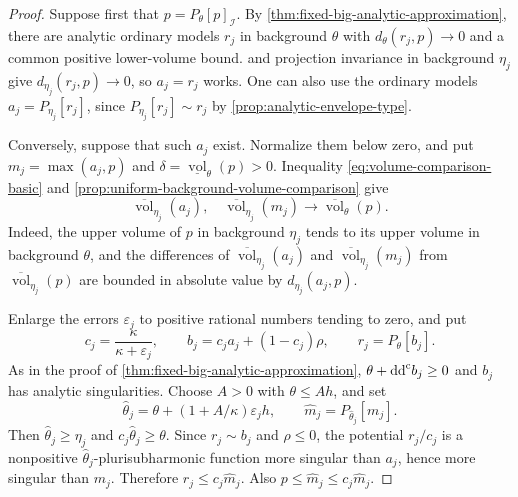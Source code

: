 \begin{proof}
Suppose first that $p=P_\theta[p]_{\mathcal I}$. By \cref{thm:fixed-big-analytic-approximation}, there are analytic ordinary models $r_j$ in background $\theta$ with $d_\theta(r_j,p)\to0$ and a common positive lower-volume bound.  and projection invariance in background $\eta_j$ give $d_{\eta_j}(r_j,p)\to0$, so $a_j=r_j$ works. One can also use the ordinary models $a_j=P_{\eta_j}[r_j]$, since $P_{\eta_j}[r_j]\sim r_j$ by \cref{prop:analytic-envelope-type}.

Conversely, suppose that such $a_j$ exist. Normalize them below zero, and put $m_j=\max(a_j,p)$ and $\delta=\underline{\operatorname{vol}}_\theta(p)>0$. Inequality \eqref{eq:volume-comparison-basic} and \cref{prop:uniform-background-volume-comparison} give
\[
 \overline{\operatorname{vol}}_{\eta_j}(a_j),\quad
 \overline{\operatorname{vol}}_{\eta_j}(m_j)
       \longrightarrow\overline{\operatorname{vol}}_\theta(p).
\]
Indeed, the upper volume of $p$ in background $\eta_j$ tends to its upper volume in background $\theta$, and the differences of $\overline{\operatorname{vol}}_{\eta_j}(a_j)$ and $\overline{\operatorname{vol}}_{\eta_j}(m_j)$ from $\overline{\operatorname{vol}}_{\eta_j}(p)$ are bounded in absolute value by $d_{\eta_j}(a_j,p)$.

Enlarge the errors $\varepsilon_j$ to positive rational numbers tending to zero, and put
\[
 c_j=\frac{\kappa}{\kappa+\varepsilon_j},\qquad
 b_j=c_ja_j+(1-c_j)\rho,\qquad r_j=P_\theta[b_j].
\]
As in the proof of \cref{thm:fixed-big-analytic-approximation}, $\theta+\mathrm{dd}^{\mathrm{c}} b_j\geq0$ and $b_j$ has analytic singularities. Choose $A>0$ with $\theta\leq Ah$, and set
\[
 \widehat\theta_j=\theta+(1+A/\kappa)\varepsilon_jh,
 \qquad \widehat m_j=P_{\widehat\theta_j}[m_j].
\]
Then $\widehat\theta_j\geq\eta_j$ and $c_j\widehat\theta_j\geq\theta$. Since $r_j\sim b_j$ and $\rho\leq0$, the potential $r_j/c_j$ is a nonpositive $\widehat\theta_j$-plurisubharmonic function more singular than $a_j$, hence more singular than $m_j$. Therefore $r_j\leq c_j\widehat m_j$. Also $p\leq\widehat m_j\leq c_j\widehat m_j$.


\end{proof}
